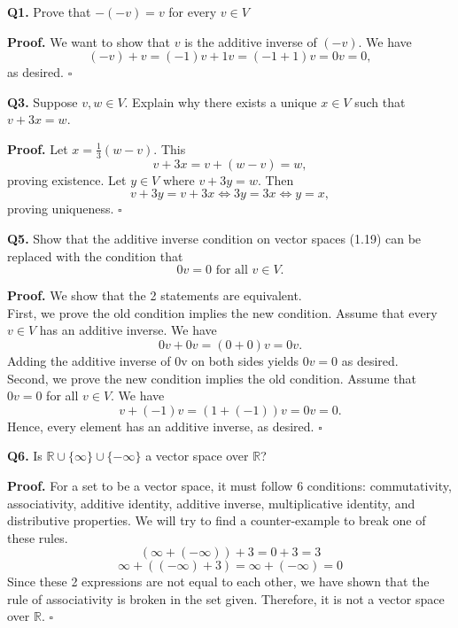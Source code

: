 \documentclass[12 pt]{article} %
\begin{document}
\textbf{Q1.}							%
Prove that $-(-v)=v$ for every $v\in V$																				%

\textbf{Proof.}              						%
We want to show that $v$ is the additive inverse of $(-v)$. We have 
$$(-v)+v=(-1)v+1v=(-1+1)v=0v=0,$$
as desired. $\square$

\textbf{Q3.}
Suppose $v,w\in V$. Explain why there exists a unique $x\in V$ such that $v+3x=w$.

\textbf{Proof.}
Let $x=\frac{1}{3}(w-v)$. This
$$v+3x=v+(w-v)=w,$$
proving existence.
Let $y\in V$ where $v+3y=w$. Then
$$v+3y=v+3x\iff 3y=3x\iff y=x,$$
proving uniqueness. $\square$

\textbf{Q5.}
Show that the additive inverse condition on vector spaces (1.19) 
can be replaced with the condition that
$$0v=0 \text{ for all } v\in V.$$

\textbf{Proof.}
We show that the 2 statements are equivalent.\\
First, we prove the old condition implies the new condition.
Assume that every $v\in V$ has an additive inverse.
We have
$$0v+0v=(0+0)v=0v.$$
Adding the additive inverse of 0v on both sides yields
$0v=0$ as desired.\\
Second, we prove the new condition implies the old condition.
Assume that $0v=0$ for all $v\in V$.
We have
$$v+(-1)v=(1+(-1))v=0v=0.$$
Hence, every element has an additive inverse, as desired. $\square$

\textbf{Q6.}
Is $\mathbb{R}\cup\{\infty\}\cup\{-\infty\}$ a vector space over $\mathbb{R}$?

\textbf{Proof.}
For a set to be a vector space, it must follow 6 conditions:
commutativity, associativity, additive identity, additive inverse, multiplicative identity, and distributive properties.
We will try to find a counter-example to break one of these rules.
$$(\infty+(-\infty))+3=0+3=3$$
$$\infty+((-\infty)+3)=\infty+(-\infty)=0$$
Since these 2 expressions are not equal to each other, we have shown that the rule of associativity
is broken in the set given. Therefore, it is not a vector space over $\mathbb{R}$. $\square$
\end{document}
